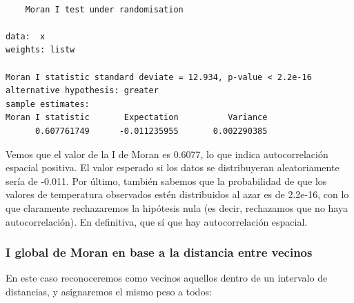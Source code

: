 \documentclass[
  letterpaper,
  DIV=11,
  numbers=noendperiod]{scrreprt}
\newenvironment{Shaded}{\begin{snugshade}}{\end{snugshade}}
\newcommand{\AttributeTok}[1]{\textcolor[rgb]{0.40,0.45,0.13}{#1}}
\newcommand{\CommentTok}[1]{\textcolor[rgb]{0.37,0.37,0.37}{#1}}
\newcommand{\DecValTok}[1]{\textcolor[rgb]{0.68,0.00,0.00}{#1}}
\newcommand{\FunctionTok}[1]{\textcolor[rgb]{0.28,0.35,0.67}{#1}}
\newcommand{\NormalTok}[1]{\textcolor[rgb]{0.00,0.23,0.31}{#1}}
\newcommand{\OtherTok}[1]{\textcolor[rgb]{0.00,0.23,0.31}{#1}}
\newcommand{\SpecialCharTok}[1]{\textcolor[rgb]{0.37,0.37,0.37}{#1}}
\begin{document}
\begin{verbatim}

    Moran I test under randomisation

data:  x  
weights: listw    

Moran I statistic standard deviate = 12.934, p-value < 2.2e-16
alternative hypothesis: greater
sample estimates:
Moran I statistic       Expectation          Variance 
      0.607761749      -0.011235955       0.002290385 
\end{verbatim}

Vemos que el valor de la I de Moran es 0.6077, lo que indica
autocorrelación espacial positiva. El valor esperado si los datos se
distribuyeran aleatoriamente sería de -0.011. Por último, también
sabemos que la probabilidad de que los valores de temperatura observados
estén distribuidos al azar es de 2.2e-16, con lo que claramente
rechazaremos la hipótesis nula (es decir, rechazamos que no haya
autocorrelación). En definitiva, que sí que hay autocorrelación
espacial.

\hypertarget{i-global-de-moran-en-base-a-la-distancia-entre-vecinos}{%
\subsubsection{I global de Moran en base a la distancia entre
vecinos}\label{i-global-de-moran-en-base-a-la-distancia-entre-vecinos}}

En este caso reconoceremos como vecinos aquellos dentro de un intervalo
de distancias, y asignaremos el mismo peso a todos:

\begin{Shaded}
\end{Shaded}
\end{document}
